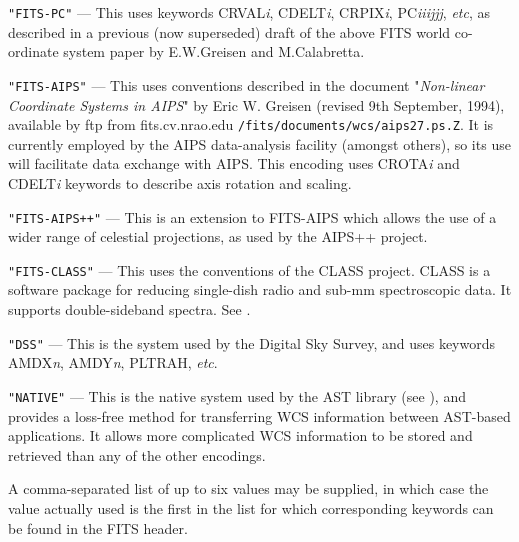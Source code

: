 \documentclass[twoside,11pt]{starlink}
\begin{document}
{{{{         \sstitem
            \texttt{"FITS-PC"} --- This uses keywords CRVAL\textit{i},
            CDELT\textit{i}, CRPIX\textit{i}, PC\textit{iiijjj},
            \textit{etc}, as described in a previous (now superseded) draft of
            the above FITS world co-ordinate system paper by E.W.Greisen and
            M.Calabretta.

         \sstitem
            \texttt{"FITS-AIPS"} --- This uses conventions described in the
            document "\textit{Non-linear Coordinate Systems in AIPS}" by
            Eric W. Greisen (revised 9th September, 1994), available by ftp
            from fits.cv.nrao.edu \texttt{/fits/documents/wcs/aips27.ps.Z}.
            It is currently employed by the AIPS data-analysis facility
            (amongst others), so its use will facilitate data exchange with
            AIPS. This encoding uses CROTA\textit{i} and CDELT\textit{i}
            keywords to describe axis rotation and scaling.

         \sstitem
            \texttt{"FITS-AIPS++"} --- This is an extension to FITS-AIPS which
            allows the use of a wider range of celestial projections, as used by
            the AIPS++ project.

         \sstitem
            \texttt{"FITS-CLASS"} --- This uses the conventions of the CLASS
            project.  CLASS is a software package for reducing
            single-dish radio and sub-mm spectroscopic data.  It
            supports double-sideband spectra.  See
            .

         \sstitem
            \texttt{"DSS"} --- This is the system used by the Digital Sky Survey,
            and uses keywords AMDX\textit{n}, AMDY\textit{n}, PLTRAH,
            \emph{etc}.

         \sstitem
            \texttt{"NATIVE"} --- This is the native system used by the
            AST library (see ), and provides a
            loss-free method for transferring WCS information between
            AST-based applications.  It allows more complicated WCS
            information to be stored and retrieved than any of the other
            encodings.
         }

         A comma-separated list of up to six values may be supplied, in
         which case the value actually used is the first in the list for
         which corresponding keywords can be found in the FITS header.

}}}
\end{document}
